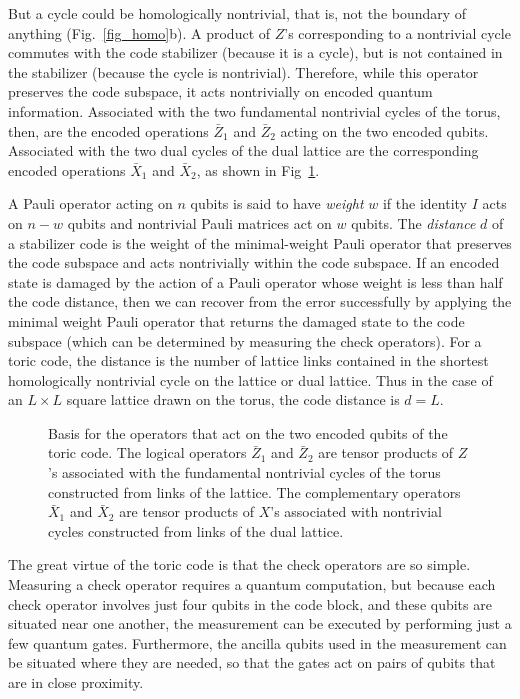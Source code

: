 But a cycle could be homologically nontrivial, that is, not the boundary of anything (Fig.~\ref{fig_homo}b). A product of $Z$'s corresponding to a nontrivial cycle commutes with the code stabilizer (because it is a cycle), but is not contained in the stabilizer (because the cycle is nontrivial). Therefore, while this operator preserves the code subspace, it acts nontrivially on encoded quantum information. Associated with the two fundamental nontrivial cycles of the torus, then, are the encoded operations $\bar Z_1$ and $\bar Z_2$ acting on the two encoded qubits.  Associated with the two dual cycles of the dual lattice are the corresponding encoded operations $\bar X_1$ and $\bar X_2$, as shown in Fig~\ref{fig_logical}.

A Pauli operator acting on $n$ qubits is said to have {\em weight} $w$ if the identity $I$ acts on $n-w$ qubits and nontrivial Pauli matrices act on $w$ qubits. The {\em distance} $d$ of a stabilizer code is the weight of the minimal-weight Pauli operator that preserves the code subspace and acts nontrivially within the code subspace. If an encoded state is damaged by the action of a Pauli operator whose weight is less than half the code distance, then we can recover from the error successfully by applying the minimal weight Pauli operator that returns the damaged state to the code subspace (which can be determined by measuring the check operators). For a toric code, the distance is the number of lattice links contained in the shortest homologically nontrivial cycle on the lattice or dual lattice. Thus in the case of an $L\times L$ square lattice drawn on the torus, the code distance is $d=L$. 

\begin{figure}
\begin{center}
\leavevmode
\epsfxsize=3in
\end{center}
\caption{Basis for the operators that act on the two encoded qubits of the toric code. The logical operators $\bar Z_1$ and $\bar Z_2$ are tensor products of $Z$'s associated with the fundamental nontrivial cycles of the torus constructed from links of the lattice. The complementary operators $\bar X_1$ and $\bar X_2$ are tensor products of $X$'s associated with  nontrivial cycles constructed from links of the dual lattice.}
\label{fig_logical}
\end{figure}

The great virtue of the toric code is that the check operators are so simple. Measuring a check operator requires a quantum computation, but because each check operator involves just four qubits in the code block, and these qubits are situated near one another, the measurement can be executed by performing just a few quantum gates.  Furthermore, the ancilla qubits used in the measurement can be situated where they are needed, so that the gates act on pairs of qubits that are in close proximity.

